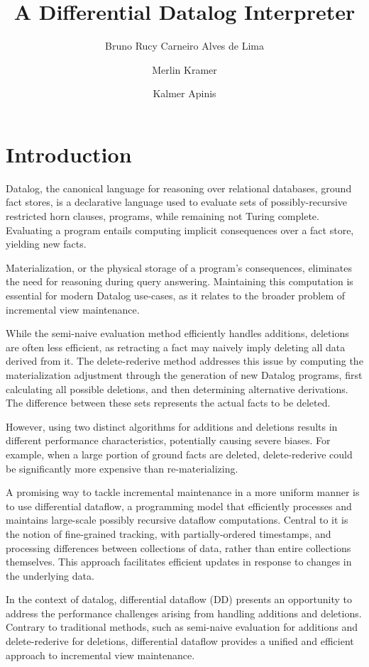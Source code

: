\documentclass[sigconf,screen,review,natbib]{acmart}
\title{A Differential Datalog Interpreter}
\author{Bruno Rucy Carneiro Alves de Lima}
\affiliation{%
	\institution{University of Tartu}
	\department{Institute of Computer Science}
	\city{Tartu}
	\country{Estonia}
}
\author{Merlin Kramer}
\affiliation{%
	\institution{unaffiliated}
	\city{Wuppertal}
	\country{Germany}
}
\author{Kalmer Apinis}
\affiliation{%
	\institution{University of Tartu}
	\department{Institute of Computer Science}
	\city{Tartu}
	\country{Estonia}
}
\theoremstyle{definition}
\begin{document}
\maketitle

\section{Introduction}
Datalog\cite{datalog}, the canonical language for reasoning over relational databases, ground fact stores, is a
declarative language used to evaluate sets of possibly-recursive restricted horn clauses, programs, while
remaining not Turing complete. Evaluating a program entails computing implicit consequences over a fact
store, yielding new facts.

Materialization, or the physical storage of a program's consequences, eliminates the need for reasoning
during query answering. Maintaining this computation is essential for modern Datalog use-cases, as it
relates to the broader problem of incremental view maintenance.

While the semi-naive evaluation method\cite{datalog} efficiently handles additions, deletions are often less efficient, as
retracting a fact may naively imply deleting all data derived from it. The delete-rederive\cite{dred} method addresses
this issue by computing the materialization adjustment through the generation of new Datalog programs, first
calculating all possible deletions, and then determining alternative derivations. The difference between these
sets represents the actual facts to be deleted.

However, using two distinct algorithms for additions and deletions results in different performance characteristics,
potentially causing severe biases. For example, when a large portion of ground facts are deleted, delete-rederive
could be significantly more expensive than re-materializing.

A promising way to tackle incremental maintenance in a more uniform manner is to use differential dataflow, a
programming model that efficiently processes and maintains large-scale possibly recursive dataflow computations. Central
to it is the notion of fine-grained tracking, with partially-ordered timestamps, and processing differences between
collections of data, rather than entire collections themselves. This approach facilitates efficient updates in response
to changes in the underlying data\cite{differential_dataflow}.

In the context of datalog, differential dataflow (DD) presents an opportunity to address the performance challenges
arising from handling additions and deletions. Contrary to traditional methods, such as semi-naive evaluation for
additions and delete-rederive for deletions, differential dataflow provides a unified and efficient approach to
incremental view maintenance.
\end{document}
